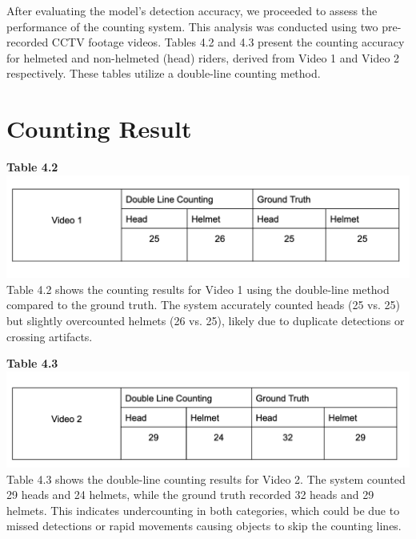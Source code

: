 \vspace{1em}

\noindent\hspace{2.5em}After evaluating the model's detection accuracy, we proceeded to assess the performance of the counting system. This analysis was conducted using two pre-recorded CCTV footage videos. Tables 4.2 and 4.3 present the counting accuracy for helmeted and non-helmeted (head) riders, derived from Video 1 and Video 2 respectively. These tables utilize a double-line counting method.

\section{Counting Result}
\vspace{0.5em}
\noindent\textbf{Table 4.2} \\
\includegraphics[width=1\textwidth]{test1.png}
\noindent\hspace{2.5em}Table 4.2 shows the counting results for Video 1 using the double-line method compared to the ground truth. The system accurately counted heads (25 vs. 25) but slightly overcounted helmets (26 vs. 25), likely due to duplicate detections or crossing artifacts.


\vspace{0.5em}
\noindent\textbf{Table 4.3} \\
\includegraphics[width=1\textwidth]{test2.png}
\noindent\hspace{2.5em}Table 4.3 shows the double-line counting results for Video 2. The system counted 29 heads and 24 helmets, while the ground truth recorded 32 heads and 29 helmets. This indicates undercounting in both categories, which could be due to missed detections or rapid movements causing objects to skip the counting lines.

